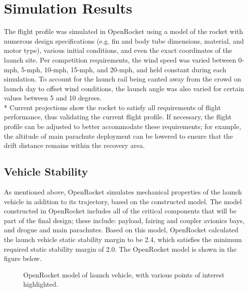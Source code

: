 \section{Simulation Results}
The flight profile was simulated in OpenRocket using a model of the rocket with numerous
design specifications (e.g. fin and body tube dimensions, material, and motor type), various initial
conditions, and even the exact coordinates of the launch site. Per competition requirements, the wind speed was varied between 0-mph, 5-mph, 10-mph, 15-mph, and 20-mph, and held constant during each simulation. To account for the launch rail being canted away from the crowd on launch day to offset wind conditions, the launch angle was also varied for certain values between 5 and 10 degrees. 
\\*
\newline
Current projections show the rocket to satisfy all requirements of flight performance, thus validating the current flight profile. If
necessary, the flight profile can be adjusted to better accommodate these requirements;
for example, the altitude of main parachute deployment can be lowered to ensure that the
drift distance remains within the recovery area.
\subsection{Vehicle Stability}
As mentioned above, OpenRocket simulates mechanical properties of the launch vehicle in addition to its trajectory, based on the constructed model. The model constructed in OpenRocket includes all of the critical components that will be part of the final design; these include: payload, fairing and coupler avionics bays, and drogue and main parachutes. Based on this model, OpenRocket calculated the launch vehicle static stability margin to be 2.4, which satisfies the minimum required static stability margin of 2.0. The OpenRocket model is shown in the figure below.
\begin{figure}[h]
\centering
    \caption{OpenRocket model of launch vehicle, with various points of interest highlighted.}
    \label{fig:my_label}
\end{figure}   

